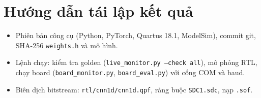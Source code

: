 \chapter{Hướng dẫn tái lập kết quả}\label{pl:tailap}

\begin{goiy}
  \begin{itemize}
    \item Phiên bản công cụ (Python, PyTorch, Quartus 18.1, ModelSim), commit git, SHA-256 \texttt{weights.h} và mô hình.
    \item Lệnh chạy: kiểm tra golden (\texttt{live\_monitor.py --check all}), mô phỏng RTL, chạy board (\texttt{board\_monitor.py}, \texttt{board\_eval.py}) với cổng COM và baud.
    \item Biên dịch bitstream: \texttt{rtl/cnn1d/cnn1d.qpf}, ràng buộc \texttt{SDC1.sdc}, nạp \texttt{.sof}.
  \end{itemize}
\end{goiy}
